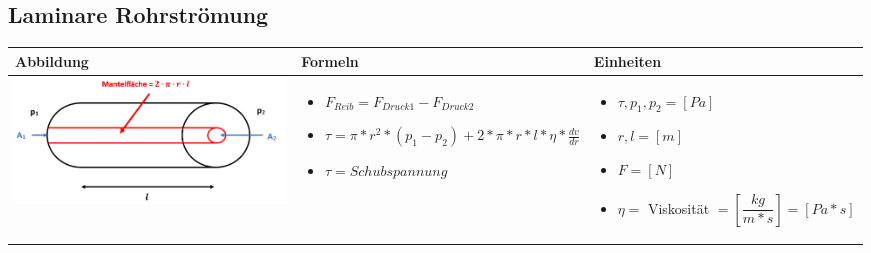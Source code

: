 \newpage

\subsection{Laminare Rohrströmung}				%
\begin{table}[h!]
	\begin{tabular}{ | m{7cm} | m{7cm} | m{4cm} | }
		\hline
		Abbildung & Formeln & Einheiten \\ \hline
		\midrule
		\begin{minipage}{.3\textwidth}
			\includegraphics[width=7.2cm]{Figures/laminar}
		\end{minipage}
		&
		\begin{itemize}
			\item $F_{Reib}=F_{Druck1}-F_{Druck2}$	
			\item $\tau=\pi*r^{2}*(p_{1}-p_{2})+2*\pi*r*l*\eta*\frac{dv}{dr}$	
			\item $\tau=Schubspannung$

		\end{itemize}
		& 
		\begin{itemize}
			\item $\tau,p_{1},p_{2}=[Pa]$
			\item $r,l=[m]$
			\item $F=[N]$
			\item $\eta=$ Viskosität $=[\dfrac{kg}{m*s}]=[Pa*s]$
		\end{itemize}
		\\ \hline
	\end{tabular}
\end{table}

